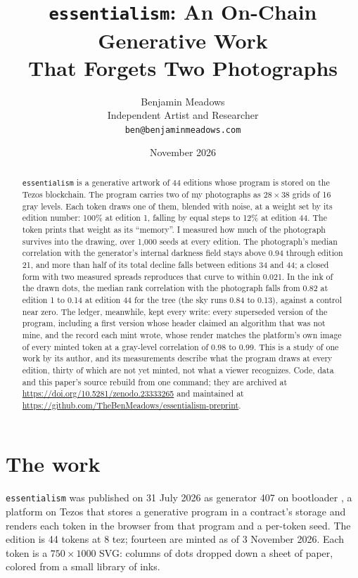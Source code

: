 \documentclass[11pt]{article}
\title{\texttt{essentialism}: An On-Chain Generative Work\\That Forgets Two Photographs}
\author{Benjamin Meadows\\Independent Artist and Researcher\\\texttt{ben@benjaminmeadows.com}}
\date{November 2026}
\begin{document}
\maketitle

\begin{abstract}
\texttt{essentialism} is a generative artwork of 44 editions whose program is stored on the Tezos blockchain. The program carries two of my photographs as $28\times38$ grids of 16 gray levels. Each token draws one of them, blended with noise, at a weight set by its edition number: 100\% at edition 1, falling by equal steps to 12\% at edition 44. The token prints that weight as its ``memory''. I measured how much of the photograph survives into the drawing, over 1{,}000 seeds at every edition. The photograph's median correlation with the generator's internal darkness field stays above 0.94 through edition 21, and more than half of its total decline falls between editions 34 and 44; a closed form with two measured spreads reproduces that curve to within 0.021. In the ink of the drawn dots, the median rank correlation with the photograph falls from 0.82 at edition 1 to 0.14 at edition 44 for the tree (the sky runs 0.84 to 0.13), against a control near zero. The ledger, meanwhile, kept every write: every superseded version of the program, including a first version whose header claimed an algorithm that was not mine, and the record each mint wrote, whose render matches the platform's own image of every minted token at a gray-level correlation of 0.98 to 0.99. This is a study of one work by its author, and its measurements describe what the program draws at every edition, thirty of which are not yet minted, not what a viewer recognizes. Code, data and this paper's source rebuild from one command; they are archived at \url{https://doi.org/10.5281/zenodo.23333265} and maintained at \url{https://github.com/TheBenMeadows/essentialism-preprint}.
\end{abstract}

\section{The work}

\texttt{essentialism} \citep{essentialism2026} was published on 31 July 2026 as generator 407 on bootloader \citep{bootloader}, a platform on Tezos \citep{goodman2014} that stores a generative program in a contract's storage and renders each token in the browser from that program and a per-token seed. The edition is 44 tokens at 8 tez; fourteen are minted as of 3 November 2026. Each token is a $750\times1000$ SVG: columns of dots dropped down a sheet of paper, colored from a small library of inks.
\end{document}
